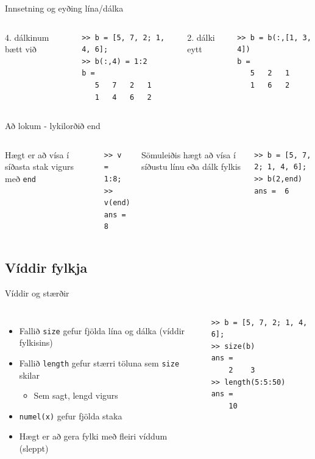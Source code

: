 \documentclass[handout]{beamer}
\begin{document}
\begin{frame}[fragile]{Innsetning og eyðing lína/dálka}
\begin{columns}
4. dálkinum bætt við
\begin{verbatim}
>> b = [5, 7, 2; 1, 4, 6];
>> b(:,4) = 1:2
b =
   5   7   2   1
   1   4   6   2
\end{verbatim}
2. dálki eytt
\begin{verbatim}
>> b = b(:,[1, 3, 4])
b =
   5   2   1
   1   6   2
\end{verbatim}
\vspace{\baselineskip}
\end{columns}
\end{frame}

\begin{frame}[fragile]{Að lokum - lykilorðið end}
\begin{columns}
Hægt er að vísa í síðasta stak vigurs með \texttt{end}
\begin{verbatim}
>> v = 1:8;
>> v(end)
ans =  8
\end{verbatim}
Sömuleiðis hægt að vísa í síðustu línu eða dálk fylkis
\begin{verbatim}
>> b = [5, 7, 2; 1, 4, 6];
>> b(2,end)
ans =  6
\end{verbatim}
\end{columns}
\end{frame}

\subsection{Víddir fylkja}

\begin{frame}[fragile]{Víddir og stærðir}
\begin{columns}
\begin{itemize}
 \item Fallið \texttt{size} gefur fjölda lína og dálka (víddir fylkisins)
 \item Fallið \texttt{length} gefur stærri töluna sem \texttt{size} skilar
 \begin{itemize}
  \item Sem sagt, lengd vigurs
 \end{itemize}
 \item \texttt{numel(x)} gefur fjölda staka
 \item Hægt er að gera fylki með fleiri víddum (sleppt)
\end{itemize}
\begin{verbatim}
>> b = [5, 7, 2; 1, 4, 6];
>> size(b)
ans = 
    2    3
>> length(5:5:50)
ans = 
    10
\end{verbatim}
\end{columns}
\end{frame}
\end{document}
